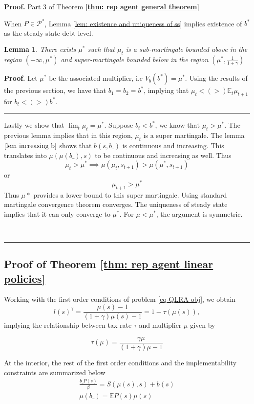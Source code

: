\documentclass[thmsb,11pt]{article}
\newtheorem{lemma}{Lemma}
\newcommand{\EE}{\mathbb E}
\newenvironment{proof}[1][Proof]{\noindent \textbf{#1.} }{\  \rule{0.5em}{0.5em}}
\begin{document}
\begin{proof}
{Part 3 of Theorem \textbf{\ref{thm: rep agent general theorem}}}


When $P\in\mathcal{P}^*$, Lemma \ref{lem: existence and uniqueness of ss} implies existence of $b^*$ as the steady state debt level.
\begin{lemma}
\label{sub super martingale}
There exists $\mu^*$ such that $\mu_t$  is a sub-martingale bounded above in the region $(-\infty,\mu^*)$ and super-martingale bounded below in the region $(\mu^*,\frac{1}{1+\gamma})$


\end{lemma}
\begin{proof}
Let $\mu^*$ be the associated multiplier, i.e $V_b(b^*)=\mu^*$.  Using the results of the previous section, we have that $b_1 = b_2 = b^*$, implying that $\mu_t < (>) \EE_t\mu_{t+1}$ for $b_t  < (>) b^*$.
\end{proof}

Lastly we show that $\lim_t \mu_t=\mu^*$. Suppose $b_{t}<b^*$, we know that $\mu_t>\mu^*$. The previous lemma implies that in this region, $\mu_t$ is a super martingale. The lemma $\ref{lem increasing b}$ shows that $b(s,b\_)$ is continuous and increasing. This translates into $\mu(\mu(b\_),s)$ to be continuous and increasing as well.
 Thus
 \[\mu_{t}>\mu^* \implies \mu(\mu_{t},s_{t+1})>\mu(\mu^*,s_{t+1}) \]
or
 \[\mu_{t+1}>\mu^*\]
Thus $\mu*$  provides a lower bound to this super martingale. Using standard martingale convergence theorem converges. The uniqueness of steady state implies that it can only converge to $\mu^*$. For $\mu<\mu^*$, the argument is symmetric.


\end{proof}

\newpage

\subsection{Proof of Theorem \protect\ref{thm: rep agent linear policies}}
\label{appndx: ergodic distribution linearization}
Working with the first order conditions of problem \ref{eq-QLRA obj}, we obtain
\[
	l(s)^\gamma = \frac{\mu(s)-1}{(1+\gamma)\mu(s) - 1} = 1-\tau(\mu(s)),
\]
implying the relationship between tax rate $\tau$ and multiplier $\mu$ given by

\begin{equation}\label{eq.tau}
	\tau(\mu) = \frac{\gamma\mu}{(1+\gamma)\mu-1}
\end{equation}

At the interior, the rest of the first order conditions  and the implementability constraints are summarized below
\begin{align*}
	\frac{b\_ P(s)}{\beta }= S(\mu(s),s) + b(s)\\
	\mu(b\_) = \EE P(s) \mu(s)\\
\end{align*}
\end{document}
